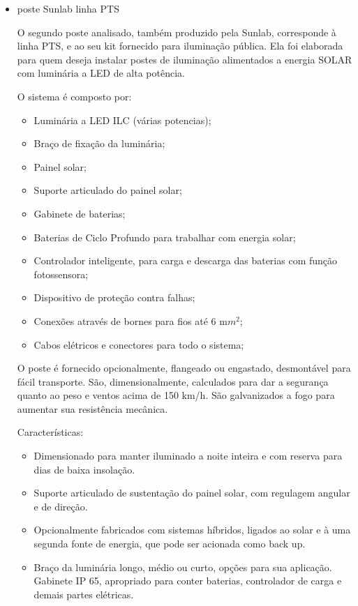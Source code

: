 \begin{itemize}
	\item poste Sunlab linha PTS
	
	O segundo poste analisado, também  produzido pela Sunlab, corresponde à linha PTS, e ao seu kit fornecido para iluminação pública. Ela foi elaborada para quem deseja instalar postes de iluminação alimentados a energia SOLAR com luminária a LED de alta potência.
	
	O sistema é composto por:
	\begin{itemize}
	\item Luminária a LED ILC (várias potencias);
	\item Braço de fixação da luminária;
	\item Painel solar;
	\item Suporte articulado do painel solar;
 	\item Gabinete de baterias; 
 	\item Baterias de Ciclo Profundo para trabalhar com energia solar;
	\item Controlador inteligente, para carga e descarga das baterias com função fotossensora;
 	\item Dispositivo de proteção contra falhas;
	\item Conexões através de bornes para fios até 6 m$m^{2}$;
	\item Cabos elétricos e conectores para todo o sistema;
	\end{itemize}
	
	O poste é fornecido opcionalmente, flangeado ou engastado, desmontável para fácil transporte. São, dimensionalmente, calculados para dar a segurança quanto ao peso e ventos acima de 150 km/h. São galvanizados a fogo para aumentar sua resistência mecânica.
	
	Características:
	
	\begin{itemize}
	\item Dimensionado para manter iluminado a noite inteira e com reserva para dias de baixa insolação.
	\item Suporte articulado de sustentação do painel solar, com regulagem angular e de direção. 
 	\item Opcionalmente fabricados com sistemas híbridos, ligados ao solar e à uma segunda fonte de energia, que pode ser acionada como back up. 
	\item Braço da luminária longo, médio ou curto, opções para sua aplicação.
Gabinete IP 65, apropriado para conter baterias, controlador de carga e demais partes elétricas.
	\end{itemize}


\end{itemize}
